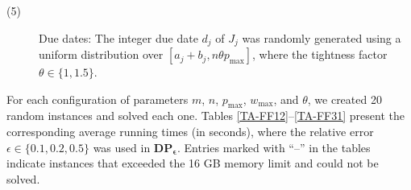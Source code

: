 \documentclass[12pt, eqno, limlimits]{article}
\begin{document}
\begin{sloppypar}
\begin{description}
            \item[(5)] Due dates: The integer due date $d_j$ of $J_j$ was randomly generated using a uniform distribution over $[a_j+b_j, n \theta p_{\max}]$, where the tightness factor $\theta \in \{1, 1.5\}$. 
        \end{description}
        
        For each configuration of parameters $m$, $n$, $p_{\max}$, $w_{\max}$, and $\theta$, we created 20 random instances and solved each one. Tables \ref{TA-FF12}--\ref{TA-FF31} present the corresponding average running times (in seconds), where the relative error $\epsilon \in \{0.1, 0.2, 0.5\}$ was used in $\mathbf{DP_{\epsilon}}$. Entries marked with  ``–'' in the tables indicate instances that exceeded the 16 GB memory limit and could not be solved. 
        

\end{sloppypar}
\end{document}
